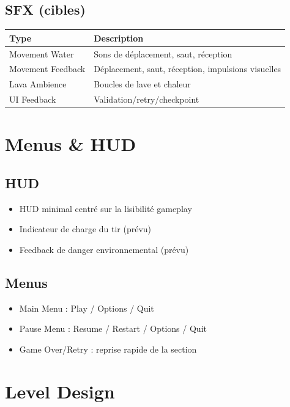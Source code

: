 ﻿\documentclass[12pt,a4paper]{article}
\begin{document}
\subsection{SFX (cibles)}
\begin{table}[h]
\centering
\begin{tabularx}{\textwidth}{|l|X|}
\hline
\textbf{Type} & \textbf{Description} \\ \hline
Movement Water & Sons de déplacement, saut, réception \\ \hline
Movement Feedback & Déplacement, saut, réception, impulsions visuelles \\ \hline
Lava Ambience & Boucles de lave et chaleur \\ \hline
UI Feedback & Validation/retry/checkpoint \\ \hline
\end{tabularx}
\end{table}

\section{Menus \& HUD}

\subsection{HUD}
\begin{itemize}[noitemsep]
    \item HUD minimal centré sur la lisibilité gameplay
    \item Indicateur de charge du tir (prévu)
    \item Feedback de danger environnemental (prévu)
\end{itemize}

\subsection{Menus}
\begin{itemize}[noitemsep]
    \item Main Menu : Play / Options / Quit
    \item Pause Menu : Resume / Restart / Options / Quit
    \item Game Over/Retry : reprise rapide de la section
\end{itemize}

\section{Level Design}
\end{document}
